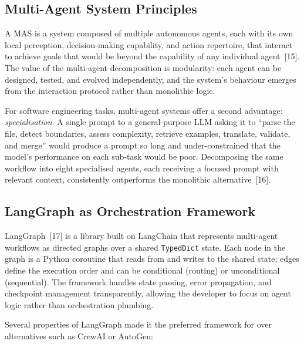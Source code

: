 \subsection{Multi-Agent System Principles}
\label{subsec:mas-principles}

A \ac{MAS} is a system composed of multiple autonomous agents, each with its
own local perception, decision-making capability, and action repertoire, that
interact to achieve goals that would be beyond the capability of any individual
agent~[15]. The value of the multi-agent decomposition is modularity: each
agent can be designed, tested, and evolved independently, and the system's
behaviour emerges from the interaction protocol rather than monolithic logic.

For software engineering tasks, multi-agent systems offer a second advantage:
\emph{specialisation}. A single prompt to a general-purpose \ac{LLM} asking it
to ``parse the file, detect boundaries, assess complexity, retrieve examples,
translate, validate, and merge'' would produce a prompt so long and
under-constrained that the model's performance on each sub-task would be poor.
Decomposing the same workflow into eight specialised agents, each receiving a
focused prompt with relevant context, consistently outperforms the monolithic
alternative~[16].

\subsection{LangGraph as Orchestration Framework}
\label{subsec:langgraph-theory}

LangGraph~[17] is a library built on LangChain that represents multi-agent
workflows as directed graphs over a shared \texttt{TypedDict} state. Each node
in the graph is a Python coroutine that reads from and writes to the shared
state; edges define the execution order and can be conditional (routing) or
unconditional (sequential). The framework handles state passing, error
propagation, and checkpoint management transparently, allowing the developer
to focus on agent logic rather than orchestration plumbing.

Several properties of LangGraph made it the preferred framework for \codara{}
over alternatives such as CrewAI or AutoGen:

